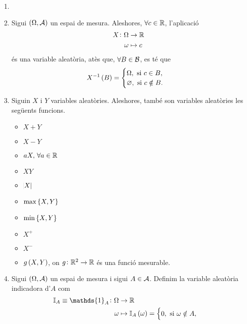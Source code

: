 \begin{example}
    \begin{enumerate}[1.]
        \item[]
        \item Sigui $\left( \Omega, \mathcal{A}\right)$ un espai de mesura. Aleshores, $\forall c\in\mathbb{R}$, l'aplicació
            \begin{align*}
                X\colon \Omega &\to\mathbb{R}\\
                \omega &\mapsto c
            \end{align*}
            és una variable aleatòria, atès que, $\forall B\in\mathcal{B}$, es té que
            \[
                X^{-1}\left( B\right)=\begin{cases}
                    \Omega, \text{ si } c\in B,\\
                    \varnothing, \text{ si } c\notin B.
                \end{cases}
            \]
        \item Siguin $X$ i $Y$ variables aleatòries. Aleshores, també son variables aleatòries les següents funcions.
            \begin{itemize}
                \item $X+Y$
                \item $X-Y$
                \item $aX,\,\forall a\in\mathbb{R}$
                \item $XY$
                \item $\abs{X}$
                \item $\max\left\{ X, Y\right\}$
                \item $\min\left\{ X, Y\right\}$
                \item $X^+$
                \item $X^-$
                \item $g\left( X, Y\right)$, on $g\colon \mathbb{R}^2\to\mathbb{R}$ és una funció mesurable.
            \end{itemize}
        \item Sigui $\left( \Omega, \mathcal{A}\right)$ un espai de mesura i sigui $A\in\mathcal{A}$. Definim la variable aleatòria indicadora d'$A$ com
            \begin{align*}
                \mathbb{I}_A\equiv\mathds{1}_A\colon \Omega &\to\real\\
                \omega &\mapsto\mathbb{I}_A\lp\omega\rp=\begin{cases}
                    0, \text{ si } \omega\notin A,\\

\end{cases}
\end{align*}
\end{enumerate}
\end{example}
